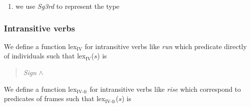 \begin{enumerate}
\item we use \textit{Sg3rd} to represent the type
\begin{display}
\end{display}

 
\end{enumerate} 
  

\subsubsection{Intransitive verbs}\label{pg:lexicon-iv}
We define a function lex$_\mathrm{IV}$ for intransitive verbs like
\textit{run} which predicate directly of individuals such that
lex$_\mathrm{IV}$($s$) is
\begin{quote}
\hspace*{-2em}\textit{Sign} \d{$\wedge$} \\
\hspace*{-2em}

\end{quote}
We define a function lex$_{\mathrm{IV}\textrm{-}\mathrm{fr}}$ for intransitive verbs like
\textit{rise} which correspond to predicates of frames such that
lex$_{\mathrm{IV}\textrm{-}\mathrm{fr}}$($s$) is
